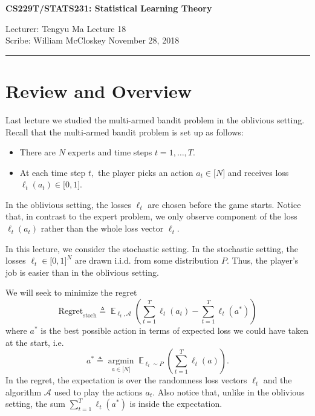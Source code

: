 \documentclass[11pt]{article}
\newcommand{\bN}{\lbrack N \rbrack}
\newcommand{\E}{\mathop{{}\mathbb{E}}}
\newcommand{\A}{ \mathcal{A}}
\DeclareMathOperator*{\argmin}{argmin}
\newcommand{\draftnotice}{\vbox to 0.25in{\noindent
   \raisebox{0.6in}[0in][0in]{\makebox[\textwidth][r]{\it
    DRAFT --- a final version will be posted shortly}}}
   \vspace{-.25in}\vspace{-\baselineskip}
}
\begin{document}
\usetikzlibrary{decorations.pathreplacing}
\thispagestyle{empty}


\begin{center}
\bf\large CS229T/STATS231: Statistical Learning Theory
\end{center}

\noindent
Lecturer: Tengyu Ma   %
\hfill
Lecture 18           %
\\
Scribe:  William McCloskey                 %
\hfill
November 28, 2018          %

\noindent
\rule{\textwidth}{1pt}

\medskip


\section{Review and Overview}

Last lecture we studied the multi-armed bandit problem in the oblivious setting. Recall that the multi-armed bandit problem is set up as follows:

\begin{itemize}
   \item There are $N$ experts and time steps $t=1, \ldots, T$.
   \item At each time step $t,$ the player picks an action $a_t \in \bN$ and receives loss $\ell_t(a_t) \in \lbrack0, 1\rbrack$.
\end{itemize}
In the oblivious setting, the losses $\ell_t$ are chosen before the game starts. Notice that, in contrast to the expert problem, we only observe component of the loss $\ell_t(a_t)$ rather than the whole loss vector $\ell_t$.

In this lecture, we consider the stochastic setting. In the stochastic setting, the losses $\ell_t \in \lbrack 0,1\rbrack^N$ are drawn i.i.d. from some distribution $P$. Thus, the player's job is easier than in the oblivious setting.

We will seek to minimize the regret \[\text{Regret}_\text{stoch} \triangleq \E_{\ell_t, \mathcal{A}} \left(\sum_{t=1}^T \ell_t(a_t)-\sum_{t=1}^T \ell_t(a^*)\right)\] where $a^*$ is the best possible action in terms of expected loss we could have taken at the start, i.e. \[a^* \triangleq \argmin\limits_{a \in \bN} \E_{\ell_t \sim P}\left(\sum_{t=1}^T \ell_t(a)\right).\] In the regret, the expectation is over the randomness loss vectors $\ell_t$ and the algorithm $\A$ used to play the actions $a_t$. Also notice that, unlike in the oblivious setting, the sum $\sum_{t=1}^T \ell_t(a^*)$ is inside the expectation.
\end{document}
